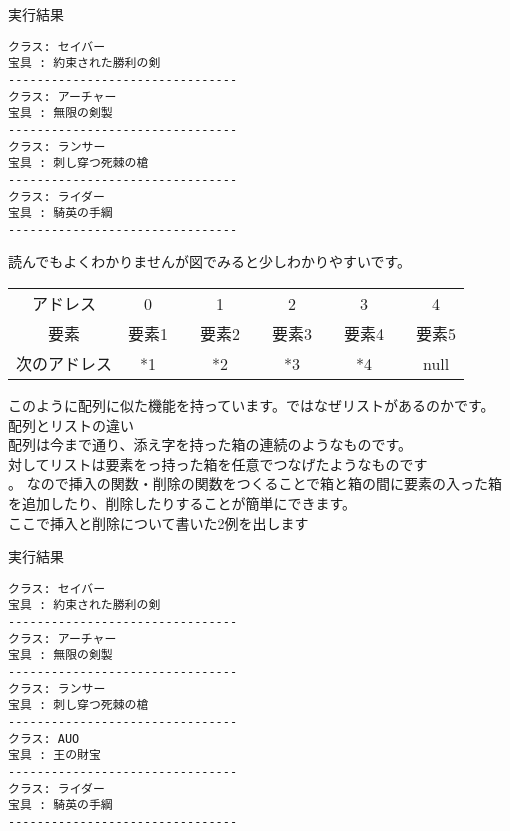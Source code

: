 \begin{itembox}{実行結果}
\begin{verbatim}
クラス: セイバー
宝具 : 約束された勝利の剣
--------------------------------
クラス: アーチャー
宝具 : 無限の剣製
--------------------------------
クラス: ランサー
宝具 : 刺し穿つ死棘の槍
--------------------------------
クラス: ライダー
宝具 : 騎英の手綱
--------------------------------
\end{verbatim}
\end{itembox}
読んでもよくわかりませんが図でみると少しわかりやすいです。
\begin{table}[htb]
\begin{center}
\begin{tabular}{|c|c|c|c|c|c|c|c|c|c|}
\cline{1-1}\cline{2-2}\cline{4-4}\cline{6-6}\cline{8-8}\cline{10-10}
アドレス & 0 && 1 && 2 && 3 && 4 \\ \cline{1-1}\cline{2-2}\cline{4-4}\cline{6-6}\cline{8-8}\cline{10-10}
要素 & 要素1 && 要素2 && 要素3 && 要素4 && 要素5\\ \cline{1-1}\cline{2-2}\cline{4-4}\cline{6-6}\cline{8-8}\cline{10-10}
次のアドレス & *1 && *2 && *3 && *4 && null   \\ 
\cline{1-1}\cline{2-2}\cline{4-4}\cline{6-6}\cline{8-8}\cline{10-10}
\end{tabular}
\end{center}
\end{table}
このように配列に似た機能を持っています。ではなぜリストがあるのかです。\\
配列とリストの違い\\
配列は今まで通り、添え字を持った箱の連続のようなものです。\\
対してリストは要素をっ持った箱を任意でつなげたようなものです\\。
なので挿入の関数・削除の関数をつくることで箱と箱の間に要素の入った箱を追加したり、削除したりすることが簡単にできます。\\

ここで挿入と削除について書いた2例を出します

\begin{itembox}{実行結果}
\begin{verbatim}
クラス: セイバー
宝具 : 約束された勝利の剣
--------------------------------
クラス: アーチャー
宝具 : 無限の剣製
--------------------------------
クラス: ランサー
宝具 : 刺し穿つ死棘の槍
--------------------------------
クラス: AUO
宝具 : 王の財宝
--------------------------------
クラス: ライダー
宝具 : 騎英の手綱
--------------------------------
\end{verbatim}
\end{itembox}

